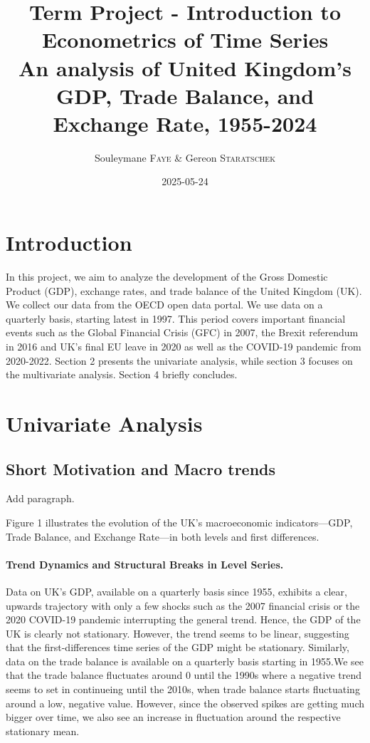 \documentclass[
]{article}
\title{Term Project - Introduction to Econometrics of Time Series \\[1.5ex] 
{\Large An analysis of United Kingdom's GDP, Trade Balance, and Exchange Rate, 1955-2024}}
\author{Souleymane \textsc{Faye} \& Gereon \textsc{Staratschek}}
\date{2025-05-24}
\begin{document}
\maketitle

\section{Introduction}

In this project, we aim to analyze the development of the Gross Domestic
Product (GDP), exchange rates, and trade balance of the United Kingdom
(UK). We collect our data from the OECD open data portal. We use data on
a quarterly basis, starting latest in 1997. This period covers important
financial events such as the Global Financial Crisis (GFC) in 2007, the
Brexit referendum in 2016 and UK's final EU leave in 2020 as well as the
COVID-19 pandemic from 2020-2022. Section 2 presents the univariate analysis,
while section 3 focuses on the multivariate analysis. Section 4 briefly concludes.

\section{Univariate Analysis}

\subsection{Short Motivation and Macro trends}

Add paragraph.

Figure 1 illustrates the evolution of the UK’s macroeconomic indicators—GDP, Trade Balance, 
and Exchange Rate—in both levels and first differences.

\paragraph*{Trend Dynamics and Structural Breaks in Level Series.} 
Data on UK's GDP, available on a quarterly basis
since 1955, exhibits a clear, upwards trajectory with only a few
shocks such as the 2007 financial crisis or the 2020 COVID-19 pandemic 
interrupting the general trend. Hence, the GDP of the UK is clearly not
stationary. However, the trend seems to be linear, suggesting that the
first-differences time series of the GDP might be stationary. Similarly, data on 
the trade balance is available on a quarterly basis starting in 1955.We see that 
the trade balance fluctuates around 0 until the 1990s where a negative trend seems to set
in continueing until the 2010s, when trade balance starts fluctuating
around a low, negative value. However, since the observed spikes are
getting much bigger over time, we also see an increase in fluctuation
around the respective stationary mean.
\end{document}
